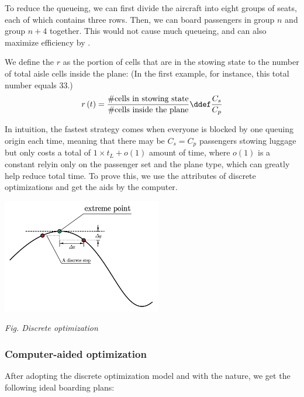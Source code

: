 \documentclass{article}
\begin{document}
	To reduce the queueing, we can first divide the aircraft into eight groups of seats, each of which contains three rows. Then, we can board passengers in group $n$ and group $n+4$ together. This would not cause much queueing, and can also maximize efficiency by .

	We define the  \(r\) as the portion of cells that are in the stowing state to the number of total aisle cells inside the plane: (In the first example, for instance, this total number equals \(33\).)
	\[r\left(t\right) = \dfrac{\#\text{cells in stowing state}}{\#\text{cells inside the plane}}\ddef\dfrac{C_s}{C_p}\]

	In intuition, the fastest strategy comes when everyone is blocked by one queuing origin each time, meaning that there may be \(C_s=C_p\) passengers stowing luggage but only costs a total of \(1\times t_L+o\left(1\right)\) amount of time, where \(o(1)\) is a constant relyin only on the passenger set and the plane type, which can greatly help reduce total time. To prove this, we use the attributes of discrete optimizations and get the aids by the computer.
	\begin{center}
		\includegraphics[height = 5cm]{discrete optimization.jpg}

		\small\textit{Fig. Discrete optimization}
	\end{center}

	\subsubsection{Computer-aided optimization}
	After adopting the discrete optimization model and with the  nature, we get the following ideal boarding plans:
\end{document}
